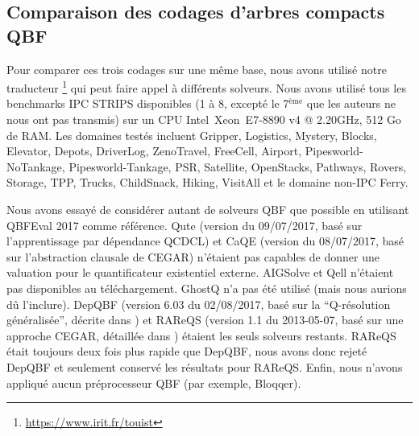 \subsection{Comparaison des codages d'arbres compacts QBF}

Pour comparer ces trois codages sur une même base, nous avons utilisé notre traducteur \touist\footnote{\url{https://www.irit.fr/touist}} \cite{DBLP:journals/corr/SlimaneCGHLMV15} qui peut faire appel à différents solveurs.
Nous avons utilisé tous les benchmarks IPC STRIPS disponibles (1 à 8, excepté le 7$^{\text{ème}}$ que les auteurs ne nous ont pas transmis) sur un CPU Intel\textregistered\ Xeon\textregistered\ E7-8890 v4 @ 2.20GHz, 512 Go de RAM. Les domaines testés incluent Gripper, Logistics, Mystery, Blocks, Elevator, Depots, DriverLog, ZenoTravel, FreeCell, Airport, Pipesworld-NoTankage, Pipesworld-Tankage, PSR, Satellite, OpenStacks, Pathways, Rovers, Storage, TPP, Trucks, ChildSnack, Hiking, VisitAll et le domaine non-IPC Ferry.

Nous avons essayé de considérer autant de solveurs QBF que possible en utilisant QBFEval 2017 comme référence. Qute (version du 09/07/2017, basé sur l'apprentissage par dépendance QCDCL) et CaQE (version du 08/07/2017, basé sur l'abstraction clausale de CEGAR) n'étaient pas capables de donner une valuation pour le quantificateur existentiel externe. AIGSolve et Qell n'étaient pas disponibles au téléchargement. GhostQ n'a pas été utilisé (mais nous aurions dû l'inclure). DepQBF (version 6.03 du 02/08/2017, basé sur la \enquote{Q-résolution généralisée}, décrite dans \cite{DBLP:conf/cade/LonsingE17}) et RAReQS (version 1.1 du 2013-05-07, basé sur une approche CEGAR, détaillée dans \cite{DBLP:conf/sat/JanotaKMC12}) étaient les seuls solveurs restants. RAReQS était toujours deux fois plus rapide que DepQBF, nous avons donc rejeté DepQBF et seulement conservé les résultats pour RAReQS. Enfin, nous n'avons appliqué aucun préprocesseur QBF (par exemple, Bloqqer).


